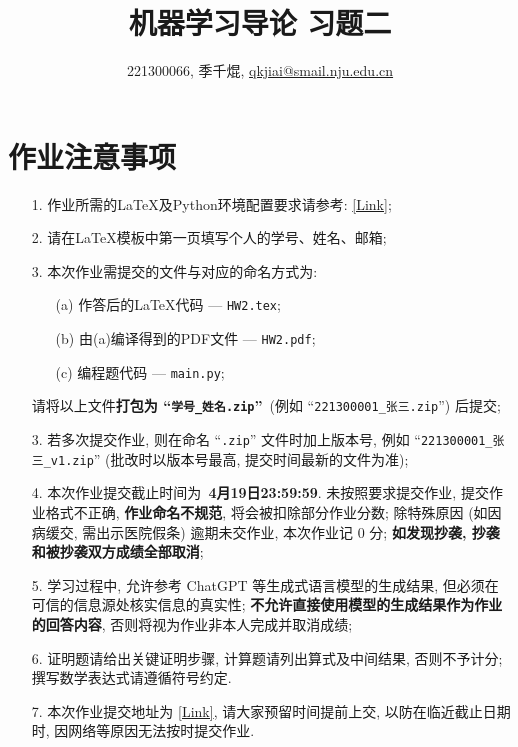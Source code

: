 \documentclass[a4paper]{article}
\numberwithin{equation}{section}
\theoremstyle{definition}
\begin{document}
\title{机器学习导论 习题二}
\author{221300066, 季千焜, \href{mailto:邮箱}{qkjiai@smail.nju.edu.cn}}
\maketitle

\section*{作业注意事项}

\begin{tcolorbox}
	\begin{enumerate}
		\item[1.] 作业所需的LaTeX及Python环境配置要求请参考: \href{https://www.lamda.nju.edu.cn/ML2024Spring/supplementary/environment.pdf}{[Link]};
		\item[2.] 请在LaTeX模板中第一页填写个人的学号、姓名、邮箱;
		\item[3.] 本次作业需提交的文件与对应的命名方式为:
		      \begin{enumerate}
			      \item [(a)] 作答后的LaTeX代码 --- \texttt{HW2.tex};
			      \item [(b)] 由(a)编译得到的PDF文件 --- \texttt{HW2.pdf};
			      \item [(c)] 编程题代码 --- \texttt{main.py};
		      \end{enumerate}
		      请将以上文件{\color{red}\textbf{打包为 ``\texttt{学号\hspace{0em}\_\hspace{0em}姓名.zip}''}}~(例如 ``\texttt{221300001\_\hspace{0em}张三.zip}'') 后提交;
		\item[3.] 若多次提交作业, 则在命名 ``\texttt{.zip}'' 文件时加上版本号, 例如 ``\texttt{221300001\_\hspace{0em}张三\hspace{0em}\_v1.zip}'' (批改时以版本号最高, 提交时间最新的文件为准);
		\item[4.] 本次作业提交截止时间为~{\color{red}\textbf{{4}月{19}日{23:59:59}}}. 未按照要求提交作业, 提交作业格式不正确, {\color{red}\textbf{作业命名不规范}}, 将会被扣除部分作业分数; 除特殊原因 (如因病缓交, 需出示医院假条) 逾期未交作业, 本次作业记 0 分; {\color{red}\textbf{如发现抄袭, 抄袭和被抄袭双方成绩全部取消}};
		\item[5.] 学习过程中, 允许参考 ChatGPT 等生成式语言模型的生成结果, 但必须在可信的信息源处核实信息的真实性; {\color{red}\textbf{不允许直接使用模型的生成结果作为作业的回答内容}}, 否则将视为作业非本人完成并取消成绩;
		\item[6.] 证明题请给出关键证明步骤, 计算题请列出算式及中间结果, 否则不予计分; 撰写数学表达式请遵循符号约定.
		\item[7.] 本次作业提交地址为 \href{https://box.nju.edu.cn/u/d/a84222be492048779a27/}{[Link]}, 请大家预留时间提前上交, 以防在临近截止日期时, 因网络等原因无法按时提交作业.
	\end{enumerate}
\end{tcolorbox}
\end{document}
